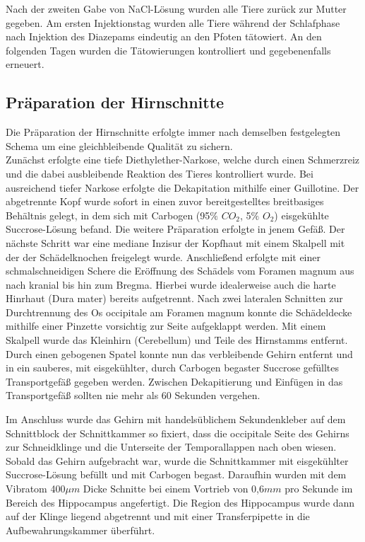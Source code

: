 \documentclass[a4paper,11pt]{report}
\begin{document}
{Nach der zweiten Gabe von NaCl-Lösung wurden alle Tiere zurück zur Mutter gegeben.
Am ersten Injektionstag wurden alle Tiere während der Schlafphase nach Injektion des Diazepams eindeutig an den Pfoten tätowiert. An den folgenden Tagen wurden die Tätowierungen kontrolliert und gegebenenfalls erneuert. \\

\subsection{Präparation der Hirnschnitte}
Die Präparation der Hirnschnitte erfolgte immer nach demselben festgelegten Schema um eine gleichbleibende Qualität zu sichern.\\
Zunächst erfolgte eine tiefe Diethylether-Narkose, welche durch einen Schmerzreiz und die dabei ausbleibende Reaktion des Tieres kontrolliert wurde. Bei ausreichend tiefer Narkose erfolgte die Dekapitation mithilfe einer Guillotine. Der abgetrennte Kopf wurde sofort in einen zuvor bereitgestelltes breitbasiges Behältnis gelegt, in dem sich mit Carbogen (95$\%$ $CO_2$, 5$\%$ $O_2$) eisgekühlte Succrose-Lösung befand. Die weitere Präparation erfolgte in jenem Gefäß. Der nächste Schritt war eine mediane Inzisur der Kopfhaut mit einem Skalpell mit der der Schädelknochen freigelegt wurde. Anschließend erfolgte mit einer schmalschneidigen Schere die Eröffnung des Schädels vom Foramen magnum aus nach kranial bis hin zum Bregma. Hierbei wurde idealerweise auch die harte Hinrhaut (Dura mater) bereits aufgetrennt. Nach zwei lateralen Schnitten zur Durchtrennung des Os occipitale am Foramen magnum konnte die Schädeldecke mithilfe einer Pinzette vorsichtig zur Seite aufgeklappt werden. Mit einem Skalpell wurde das Kleinhirn (Cerebellum) und Teile des Hirnstamms entfernt. Durch einen gebogenen Spatel konnte nun das verbleibende Gehirn entfernt und in ein sauberes, mit eisgekühlter, durch Carbogen begaster Succrose gefülltes Transportgefäß gegeben werden. Zwischen Dekapitierung und Einfügen in das Transportgefäß sollten nie mehr als 60 Sekunden vergehen. 

Im Anschluss wurde das Gehirn mit handelsüblichem Sekundenkleber auf dem Schnittblock der Schnittkammer so fixiert, dass die occipitale Seite des Gehirns zur Schneidklinge und die Unterseite der Temporallappen nach oben wiesen. Sobald das Gehirn aufgebracht war, wurde die Schnittkammer mit eisgekühlter Succrose-Lösung befüllt und mit Carbogen begast. Daraufhin wurden mit dem Vibratom 400$\mu m$ Dicke Schnitte bei einem Vortrieb von 0,6$mm$ pro Sekunde im Bereich des Hippocampus angefertigt. Die Region des Hippocampus wurde dann auf der Klinge liegend abgetrennt und mit einer Transferpipette in die Aufbewahrungskammer überführt. 

}
\end{document}
